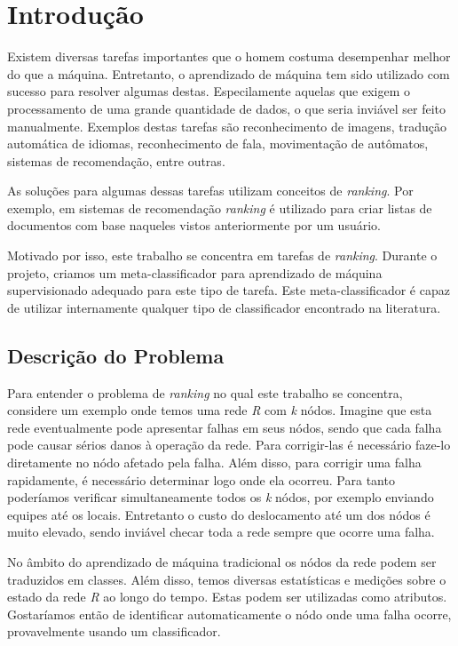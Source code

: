 \chapter{Introdução}

Existem diversas tarefas importantes que o homem costuma desempenhar melhor do que a máquina.
Entretanto, o aprendizado de máquina tem sido utilizado com sucesso para resolver algumas destas.
Especilamente aquelas que exigem o processamento de uma grande quantidade de dados, o que seria inviável ser feito manualmente.
Exemplos destas tarefas são reconhecimento de imagens, tradução automática de idiomas, reconhecimento de fala, movimentação de autômatos, sistemas de recomendação, entre outras.

As soluções para algumas dessas tarefas utilizam conceitos de \textit{ranking}.
Por exemplo, em sistemas de recomendação \textit{ranking} é utilizado para criar listas de documentos com base naqueles vistos anteriormente por um usuário.

Motivado por isso, este trabalho se concentra em tarefas de \textit{ranking}.
Durante o projeto, criamos um meta-classificador para aprendizado de máquina supervisionado adequado para este tipo de tarefa.
Este meta-classificador é capaz de utilizar internamente qualquer tipo de classificador encontrado na literatura.

\section{Descrição do Problema}

Para entender o problema de \textit{ranking} no qual este trabalho se concentra, considere um exemplo onde temos uma rede \textit{R} com \textit{k} nódos.
Imagine que esta rede eventualmente pode apresentar falhas em seus nódos, sendo que cada falha pode causar sérios danos à operação da rede.
Para corrigir-las é necessário faze-lo diretamente no nódo afetado pela falha.
Além disso, para corrigir uma falha rapidamente, é necessário determinar logo onde ela ocorreu.
Para tanto poderíamos verificar simultaneamente todos os \textit{k} nódos, por exemplo enviando equipes até os locais.
Entretanto o custo do deslocamento até um dos nódos é muito elevado, sendo inviável checar toda a rede sempre que ocorre uma falha.

No âmbito do aprendizado de máquina tradicional os nódos da rede podem ser traduzidos em classes.
Além disso, temos diversas estatísticas e medições sobre o estado da rede \textit{R} ao longo do tempo.
Estas podem ser utilizadas como atributos.
Gostaríamos então de identificar automaticamente o nódo onde uma falha ocorre, provavelmente usando um classificador.


